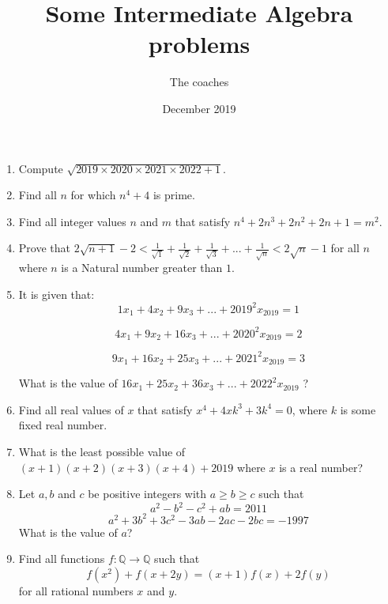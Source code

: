 \documentclass[a4paper,12pt]{article}
\begin{document}
\title {Some Intermediate Algebra problems}
\author{The coaches}
\date{December 2019}
\maketitle

\begin{enumerate}
\item %
Compute $\sqrt{2019 \times 2020 \times 2021 \times 2022 + 1}$. 

\item %
Find all $n$ for which $n^4 + 4$ is prime.

\item %
Find all integer values $n$ and $m$ that satisfy $n^4 + 2n^3 + 2n^2 + 2n + 1 = m^2$. 

\item %
Prove that $2\sqrt{n + 1} - 2 < \frac{1}{\sqrt{1}} + \frac{1}{\sqrt{2}} + \frac{1}{\sqrt{3}} + ... + \frac{1}{\sqrt{n}} < 2\sqrt{n} - 1$ for all $n$ where $n$ is a Natural number greater than $1$.

\item %
It is given that:
$$1x_1 + 4x_2 + 9x_3 + ... + 2019^2x_{2019} = 1$$

$$4x_1 + 9x_2 + 16x_3 + ... + 2020^2x_{2019} = 2$$

$$9x_1 + 16x_2 + 25x_3 + ... + 2021^2x_{2019} = 3$$

What is the value of $16x_1 + 25x_2 + 36x_3 + ... + 2022^2x_{2019}$ ?


\item %
Find all real values of $x$ that satisfy $x^4 + 4xk^3 + 3k^4 = 0$, where $k$ is some fixed real number.


\item %
What is the least possible value of $(x + 1)(x + 2)(x + 3)(x + 4) + 2019$ where $x$ is a real number?

\item %
Let $a, b$ and $c$ be positive integers with $a \ge b \ge c$ such that
$$a^2 - b^2 - c^2 + ab = 2011$$
$$a^2 + 3b^2 + 3c^2 - 3ab - 2ac - 2bc = -1997$$
What is the value of $a$?

\item %
Find all functions $f: \mathbb{Q} \rightarrow \mathbb{Q}$ such that
$$f(x^2) + f(x + 2y) = (x + 1)f(x) + 2f(y)$$
for all rational numbers $x$ and $y$.

\end{enumerate}
\end{document}
